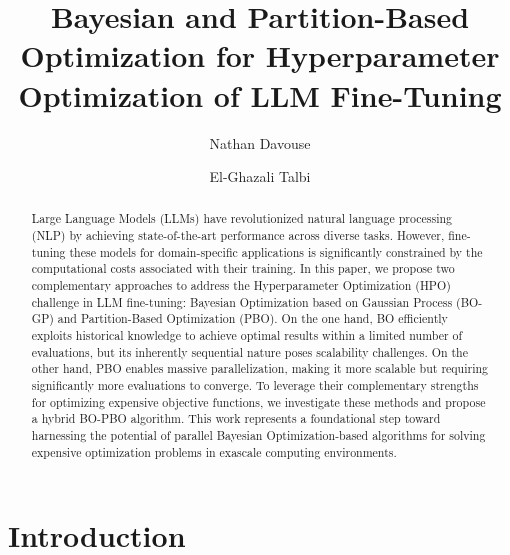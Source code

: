 \documentclass[runningheads]{llncs}
\newcommand{\rev}[1]{{#1}}
\begin{document}
\title{\rev{Bayesian and Partition-Based Optimization for Hyperparameter Optimization of LLM Fine-Tuning}}


\author{Nathan Davouse \and
El-Ghazali Talbi 
}
%
%
%
\maketitle              %
%
\begin{abstract}

\rev{Large Language Models (LLMs) have revolutionized natural language processing (NLP) by achieving state-of-the-art performance across diverse tasks. However, fine-tuning these models for domain-specific applications is significantly constrained by the computational costs associated with their training. In this paper, we propose two complementary approaches to address the Hyperparameter Optimization (HPO) challenge in LLM fine-tuning: Bayesian Optimization based on Gaussian Process (BO-GP) and Partition-Based Optimization (PBO). On the one hand, BO efficiently exploits historical knowledge to achieve optimal results within a limited number of evaluations, but its inherently sequential nature poses scalability challenges. On the other hand, PBO enables massive parallelization, making it more scalable but requiring significantly more evaluations to converge. To leverage their complementary strengths for optimizing expensive objective functions, we investigate these methods and propose a hybrid BO-PBO algorithm. This work represents a foundational step toward harnessing the potential of parallel Bayesian Optimization-based algorithms for solving expensive optimization problems in exascale computing environments.}

\end{abstract}


\section{Introduction}
\label{sec:intro}
\end{document}
